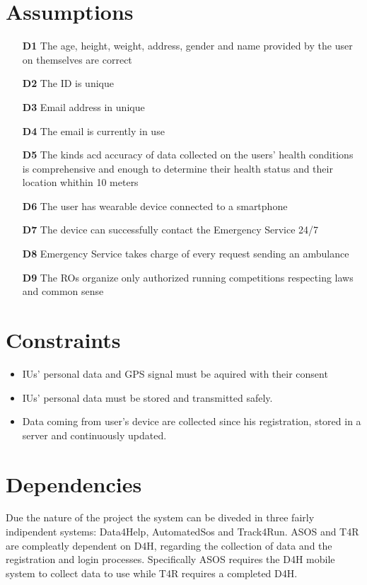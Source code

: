 \section{Assumptions}
\begin{itemize}
\item	[\textbf{D1}] The age, height, weight, address, gender and name provided by the user on themselves are correct
\item	[\textbf{D2}] The ID is unique
\item	[\textbf{D3}] Email address in unique
\item	[\textbf{D4}] The email is currently in use
\item	[\textbf{D5}] The kinds acd accuracy of data collected on the users’ health conditions is comprehensive and enough to determine their health status and their location whithin 10 meters
\item	[\textbf{D6}] The user has wearable device connected to a smartphone
\item	[\textbf{D7}] The device can successfully contact the Emergency Service 24/7
\item	[\textbf{D8}] Emergency Service takes charge of every request sending an ambulance
\item	[\textbf{D9}] The ROs organize only authorized running competitions respecting laws and common sense
\end{itemize}

\section{Constraints}
\begin{itemize}
\item IUs' personal data and GPS signal must be aquired with their consent
\item IUs' personal data must be stored and transmitted safely. 
\item Data coming from user’s device are collected since his registration, stored in a server and continuously updated.
\end{itemize}
\section{Dependencies}
Due the nature of the project the system can be diveded in three fairly indipendent systems: Data4Help, AutomatedSos and Track4Run. ASOS and T4R are compleatly dependent on D4H, regarding the collection of data and the registration and login processes. Specifically ASOS requires the D4H mobile system to collect data to use while
T4R requires a completed D4H.

